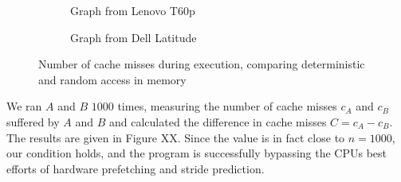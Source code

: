 
\begin{figure}
    \begin{subfigure}{0.5\textwidth}
        \centering
        \caption{Graph from Lenovo T60p}
    \end{subfigure}
    \begin{subfigure}{0.5\textwidth}
        \centering
        \caption{Graph from Dell Latitude}
    \end{subfigure}
    \caption{Number of cache misses during execution, comparing deterministic and random access in memory}
\end{figure}


We ran \(A\) and \(B\) \(1000\) times, measuring the number of cache misses \(c_A\) and \(c_B\) suffered by \(A\) and \(B\) and calculated the difference in cache misses \(C = c_A - c_B\). 
The results are given in Figure XX. Since the value is in fact close to \(n = 1000\), our condition holds, and the program is successfully bypassing the CPUs best efforts of hardware prefetching and stride prediction.

